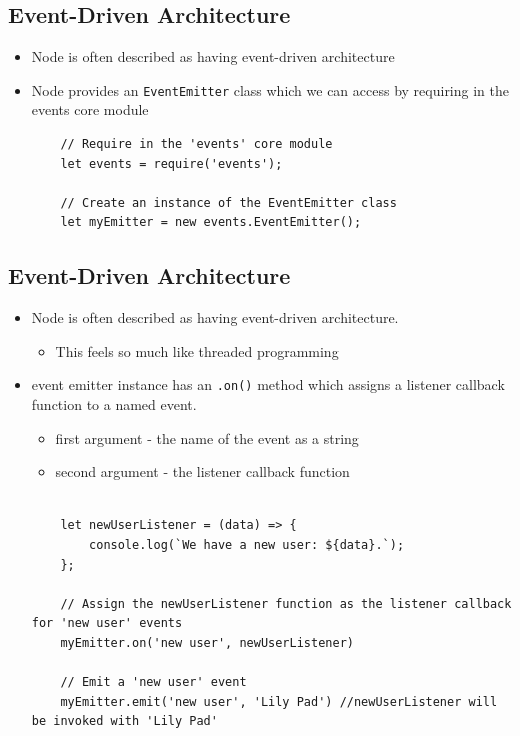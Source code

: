 \documentclass[12pt]{article}
\begin{document}
\subsection{Event-Driven Architecture}
\begin{itemize}
    \item Node is often described as having event-driven architecture
    \item Node provides an \texttt{EventEmitter} class which we can access by requiring in the events core module
    \begin{lstlisting}
    // Require in the 'events' core module
    let events = require('events');

    // Create an instance of the EventEmitter class
    let myEmitter = new events.EventEmitter();
    \end{lstlisting}
\end{itemize}

\subsection{Event-Driven Architecture}
\begin{itemize}
    \item Node is often described as having event-driven architecture.
    \begin{itemize}
        \item This feels so much like threaded programming
    \end{itemize}
    \item event emitter instance has an \texttt{.on()} method which assigns a listener callback function to a named event.
    \begin{itemize}
        \item first argument - the name of the event as a string
        \item second argument - the listener callback function
    \end{itemize}

    \begin{lstlisting}

    let newUserListener = (data) => {
        console.log(`We have a new user: ${data}.`);
    };

    // Assign the newUserListener function as the listener callback for 'new user' events
    myEmitter.on('new user', newUserListener)

    // Emit a 'new user' event
    myEmitter.emit('new user', 'Lily Pad') //newUserListener will be invoked with 'Lily Pad'
    \end{lstlisting}
\end{itemize}
\end{document}
